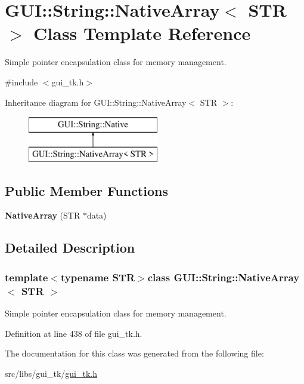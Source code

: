 \hypertarget{classGUI_1_1String_1_1NativeArray}{\section{G\-U\-I\-:\-:String\-:\-:Native\-Array$<$ S\-T\-R $>$ Class Template Reference}
\label{classGUI_1_1String_1_1NativeArray}
}


Simple pointer encapsulation class for memory management.  




{\ttfamily \#include $<$gui\-\_\-tk.\-h$>$}

Inheritance diagram for G\-U\-I\-:\-:String\-:\-:Native\-Array$<$ S\-T\-R $>$\-:\begin{figure}[H]
\begin{center}
\leavevmode
\includegraphics[height=2.000000cm]{classGUI_1_1String_1_1NativeArray}
\end{center}
\end{figure}
\subsection*{Public Member Functions}
\begin{DoxyCompactItemize}
\item 
\hypertarget{classGUI_1_1String_1_1NativeArray_ab2d403d8dcd599e11aeb76ded3106b7a}{{\bfseries Native\-Array} (S\-T\-R $\ast$data)}\label{classGUI_1_1String_1_1NativeArray_ab2d403d8dcd599e11aeb76ded3106b7a}

\end{DoxyCompactItemize}


\subsection{Detailed Description}
\subsubsection*{template$<$typename S\-T\-R$>$class G\-U\-I\-::\-String\-::\-Native\-Array$<$ S\-T\-R $>$}

Simple pointer encapsulation class for memory management. 

Definition at line 438 of file gui\-\_\-tk.\-h.



The documentation for this class was generated from the following file\-:\begin{DoxyCompactItemize}
\item 
src/libs/gui\-\_\-tk/\hyperlink{gui__tk_8h}{gui\-\_\-tk.\-h}\end{DoxyCompactItemize}
